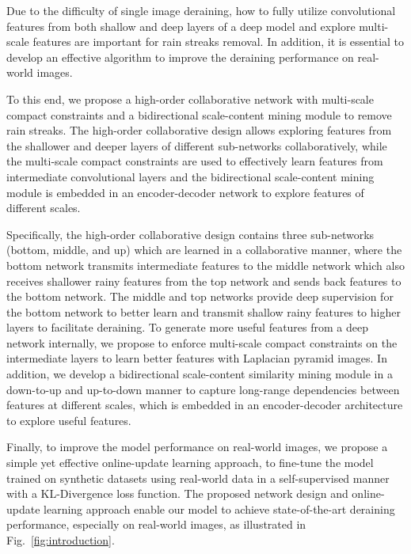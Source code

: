 \documentclass[letterpaper]{article} %
\begin{document}
Due to the difficulty of single image deraining, how to fully utilize convolutional features from both shallow and deep layers of a deep model and explore multi-scale features are important for rain streaks removal. In addition, it is essential to develop an effective algorithm to improve the deraining performance on real-world images.

To this end, we propose a high-order collaborative network with multi-scale compact constraints and a bidirectional scale-content mining module to remove rain streaks.
The high-order collaborative design allows exploring features from the shallower and deeper layers of different sub-networks collaboratively, while the multi-scale compact constraints are used to effectively learn features from intermediate convolutional layers and the bidirectional scale-content mining module is embedded in an encoder-decoder network to explore features of different scales.

Specifically, the high-order collaborative design contains three sub-networks (bottom, middle, and up) which are learned in a collaborative manner, where the bottom network transmits intermediate features to the middle network which also receives shallower rainy features from the top network and sends back features to the bottom network. The middle and top networks provide deep supervision for the bottom network to better learn and transmit shallow rainy features to higher layers to facilitate deraining. To generate more useful features from a deep network internally, we propose to enforce multi-scale compact constraints on the intermediate layers to learn better features with Laplacian pyramid images.
In addition, we develop a bidirectional scale-content similarity mining module in a down-to-up and up-to-down manner to capture long-range dependencies between features at different scales, which is embedded in an encoder-decoder architecture to explore useful features.

Finally, to improve the model performance on real-world images, we propose a simple yet effective online-update learning approach, to fine-tune the model trained on synthetic datasets using real-world data in a self-supervised manner with a KL-Divergence loss function. The proposed network design and online-update learning approach enable our model to achieve state-of-the-art deraining performance, especially on real-world images, as illustrated in Fig.~\ref{fig:introduction}.
\end{document}
